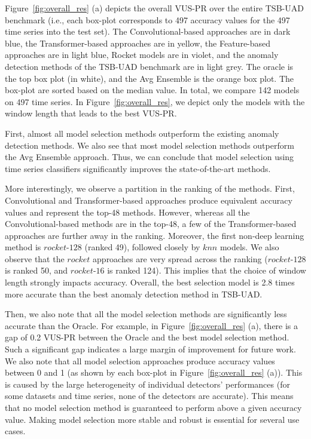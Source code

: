 Figure~\ref{fig:overall_res} (a) depicts the overall VUS-PR over the entire TSB-UAD benchmark (i.e., each box-plot corresponds to 497 accuracy values for the 497 time series into the test set). The Convolutional-based approaches are in dark blue, the Transformer-based approaches are in yellow, the Feature-based approaches are in light blue, Rocket models are in violet, and the anomaly detection methods of the TSB-UAD benchmark are in light grey. The oracle is the top box plot (in white), and the Avg Ensemble is the orange box plot. The box-plot are sorted based on the median value. In total, we compare 142 models on 497 time series. In Figure~\ref{fig:overall_res}, we depict only the models with the window length that leads to the best VUS-PR.

First, almost all model selection methods outperform the existing anomaly detection methods. We also see that most model selection methods outperform the Avg Ensemble approach. Thus, we can conclude that model selection using time series classifiers significantly improves the state-of-the-art methods. 

More interestingly, we observe a partition in the ranking of the methods. First, Convolutional and Transformer-based approaches produce equivalent accuracy values and represent the top-48 methods. However, whereas all the Convolutional-based methods are in the top-48, a few of the Transformer-based approaches are further away in the ranking. Moreover, the first non-deep learning method is $rocket$-$128$ (ranked 49), followed closely by $knn$ models. We also observe that the $rocket$ approaches are very spread across the ranking ($rocket$-$128$ is ranked 50, and $rocket$-$16$ is ranked 124). This implies that the choice of window length strongly impacts accuracy. Overall, the best selection model is 2.8 times more accurate than the best anomaly detection method in TSB-UAD.

Then, we also note that all the model selection methods are significantly less accurate than the Oracle. For example, in Figure~\ref{fig:overall_res} (a), there is a gap of 0.2 VUS-PR between the Oracle and the best model selection method. Such a significant gap indicates a large margin of improvement for future work. We also note that all model selection approaches produce accuracy values between 0 and 1 (as shown by each box-plot in Figure~\ref{fig:overall_res} (a)). This is caused by the large heterogeneity of individual detectors' performances (for some datasets and time series, none of the detectors are accurate). This means that no model selection method is guaranteed to perform above a given accuracy value. Making model selection more stable and robust is essential for several use cases.


